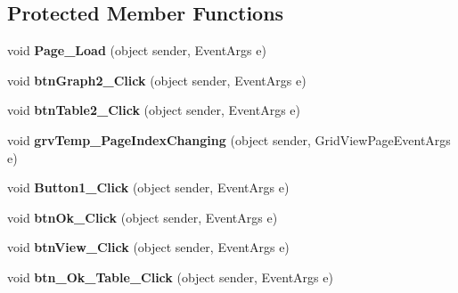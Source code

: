 \subsection*{Protected Member Functions}
\begin{DoxyCompactItemize}
\item 
\hypertarget{classusertrackothers__bodymeasurement_aab290c22aba84a7ae0880f80a3223c27}{void {\bfseries Page\-\_\-\-Load} (object sender, Event\-Args e)}\label{classusertrackothers__bodymeasurement_aab290c22aba84a7ae0880f80a3223c27}

\item 
\hypertarget{classusertrackothers__bodymeasurement_ac632b598ba14f38b7da1e19d79584070}{void {\bfseries btn\-Graph2\-\_\-\-Click} (object sender, Event\-Args e)}\label{classusertrackothers__bodymeasurement_ac632b598ba14f38b7da1e19d79584070}

\item 
\hypertarget{classusertrackothers__bodymeasurement_adf52c5f58f8224c3c827dd9320832753}{void {\bfseries btn\-Table2\-\_\-\-Click} (object sender, Event\-Args e)}\label{classusertrackothers__bodymeasurement_adf52c5f58f8224c3c827dd9320832753}

\item 
\hypertarget{classusertrackothers__bodymeasurement_a7fdc2525918d23d9e2381623d2f55502}{void {\bfseries grv\-Temp\-\_\-\-Page\-Index\-Changing} (object sender, Grid\-View\-Page\-Event\-Args e)}\label{classusertrackothers__bodymeasurement_a7fdc2525918d23d9e2381623d2f55502}

\item 
\hypertarget{classusertrackothers__bodymeasurement_a2de7bce672a16e2bece562feb94956b3}{void {\bfseries Button1\-\_\-\-Click} (object sender, Event\-Args e)}\label{classusertrackothers__bodymeasurement_a2de7bce672a16e2bece562feb94956b3}

\item 
\hypertarget{classusertrackothers__bodymeasurement_a5aec83a2539762e86fd994aa4cf63e8a}{void {\bfseries btn\-Ok\-\_\-\-Click} (object sender, Event\-Args e)}\label{classusertrackothers__bodymeasurement_a5aec83a2539762e86fd994aa4cf63e8a}

\item 
\hypertarget{classusertrackothers__bodymeasurement_acbdbf7e73a99523e5236fbe7ed52bb48}{void {\bfseries btn\-View\-\_\-\-Click} (object sender, Event\-Args e)}\label{classusertrackothers__bodymeasurement_acbdbf7e73a99523e5236fbe7ed52bb48}

\item 
\hypertarget{classusertrackothers__bodymeasurement_abfead31df0ba9a634a67b1af67003d91}{void {\bfseries btn\-\_\-\-Ok\-\_\-\-Table\-\_\-\-Click} (object sender, Event\-Args e)}\label{classusertrackothers__bodymeasurement_abfead31df0ba9a634a67b1af67003d91}


\end{DoxyCompactItemize}
